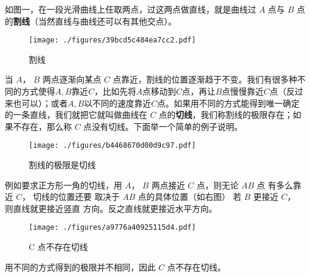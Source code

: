 


如图一，在一段光滑曲线上任取两点，过这两点做直线，就是曲线过 $A$ 点与 $B$ 点的\textbf{割线}（当然直线与曲线还可以有其他交点）。
\begin{figure}[ht]
\centering
\texttt{[image: ./figures/39bcd5c484ea7cc2.pdf]}
\caption{割线} \label{fig_TanL_1}
\end{figure}

当 $A$，  $B$ 两点逐渐向某点 $C$ 点靠近，割线的位置逐渐趋于不变。我们有很多种不同的方式使得$A, B$靠近$C$，比如先将$A$点移动到$C$点，再让$B$点慢慢靠近$C$点（反过来也可以）；或者$A, B$以不同的速度靠近$C$点。如果用不同的方式能得到唯一确定的一条直线，我们就把它就叫做曲线在 $C$ 点的\textbf{切线}，我们称割线的极限存在；如果不存在，那么称 $C$ 点没有切线。下面举一个简单的例子说明。

\begin{figure}[ht]
\vskip 0pt
\centering
\texttt{[image: ./figures/b4468670d00d9c97.pdf]}
\caption{割线的极限是切线} \label{fig_TanL_2}
\end{figure}
例如要求正方形一角的切线，用
 $A$，  $B$ 两点接近 $C$ 点，则无论 $AB$ 点
有多么靠近 $C$， 切线的位置还要
取决于 $AB$ 点的具体位置（如右图）
若 $B$ 更接近 $C$， 则直线就更接近竖直
方向。反之直线就更接近水平方向。

\begin{figure}[ht]
\centering
\texttt{[image: ./figures/a9776a40925115d4.pdf]}
\caption{C 点不存在切线} \label{fig_TanL_3}
\end{figure}

用不同的方式得到的极限并不相同，因此 $C$ 点不存在切线。

